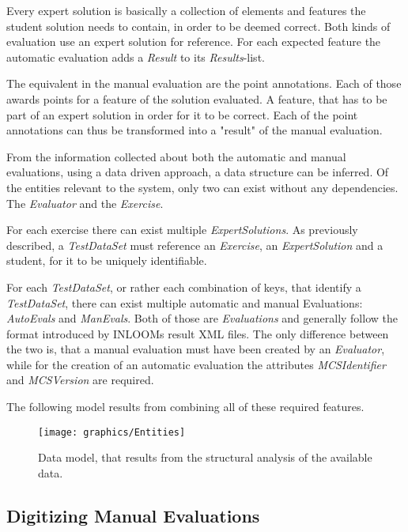 Every expert solution is basically a collection of elements and features the student solution 
needs to contain, in order to be deemed correct. Both kinds of evaluation use an expert solution
for reference. For each expected feature the automatic evaluation adds a \textit{Result} to its
\textit{Results}-list. 

The equivalent in the manual evaluation are the point annotations. Each of those awards points
for a feature of the solution evaluated. A feature, that has to be part of an expert solution in
order for it to be correct. Each of the point annotations can thus be transformed into a "result"
of the manual evaluation. 

From the information collected about both the automatic and manual evaluations, using a data 
driven approach, a data structure can be inferred. Of the entities relevant to the system,
only two can exist without any dependencies. The \textit{Evaluator} and the \textit{Exercise}. 

For each exercise there can exist multiple \textit{ExpertSolutions}. As previously described, a
\textit{TestDataSet} must reference an \textit{Exercise}, an \textit{ExpertSolution} and a 
student, for it to be uniquely identifiable. 

For each \textit{TestDataSet}, or rather each combination of keys, that identify a 
\textit{TestDataSet}, there can exist multiple automatic and manual Evaluations: 
\textit{AutoEvals} and \textit{ManEvals}. Both of those are \textit{Evaluations} and generally
follow the format introduced by INLOOMs result XML files. The only difference between the two is,
that a manual evaluation must have been created by an \textit{Evaluator}, while for the creation
of an automatic evaluation the attributes \textit{MCSIdentifier} and \textit{MCSVersion} are 
required.

The following model results from combining all of these required features.

\begin{figure}
    \caption{Data model, that results from the structural analysis of the available data.}
    \texttt{[image: graphics/Entities]}
\end{figure}
\pagebreak



\subsection{Digitizing Manual Evaluations}

